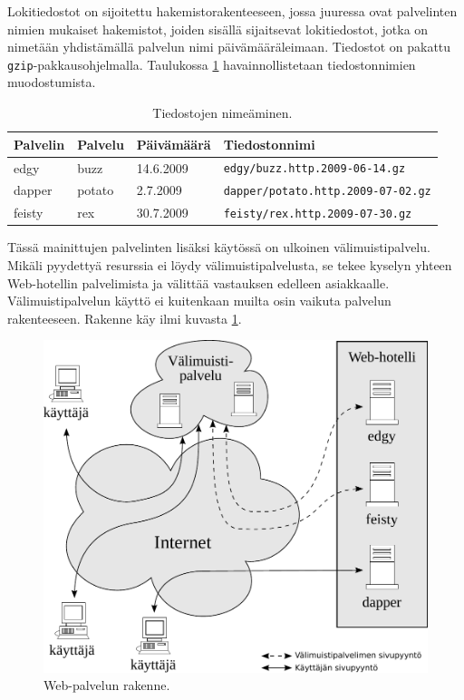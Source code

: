 Lokitiedostot on sijoitettu hakemistorakenteeseen, jossa juuressa ovat
palvelinten nimien mukaiset hakemistot, joiden sisällä sijaitsevat
lokitiedostot, jotka on nimetään yhdistämällä palvelun nimi
päivämääräleimaan. Tiedostot on pakattu
\texttt{gzip}-pakkausohjelmalla. Taulukossa \ref{tiedostot}
havainnollistetaan tiedostonnimien muodostumista.

\begin{table}[h]
\centering
\begin{tabular}{llll}
Palvelin & Palvelu & Päivämäärä & Tiedostonnimi \\
\hline
edgy & buzz & 14.6.2009 & \texttt{edgy/buzz.http.2009-06-14.gz}\\ 
dapper & potato & 2.7.2009 & \texttt{dapper/potato.http.2009-07-02.gz}\\
feisty & rex & 30.7.2009 & \texttt{feisty/rex.http.2009-07-30.gz}\\
\end{tabular}
\caption{Tiedostojen nimeäminen.}
\label{tiedostot}
\end{table}

Tässä mainittujen palvelinten lisäksi käytössä on ulkoinen
välimuistipalvelu. Mikäli pyydettyä resurssia ei löydy
välimuistipalvelusta, se tekee kyselyn yhteen Web-hotellin
palvelimista ja välittää vastauksen edelleen
asiakkaalle. Välimuistipalvelun käyttö ei kuitenkaan muilta osin
vaikuta palvelun rakenteeseen. Rakenne käy ilmi kuvasta
\ref{palvelinrakenne}.

\begin{figure}[htp]
\centering
\includegraphics[width=12cm]{pics/palvelinrakenne.pdf}
\caption{Web-palvelun rakenne.}
\label{palvelinrakenne}
\end{figure}

